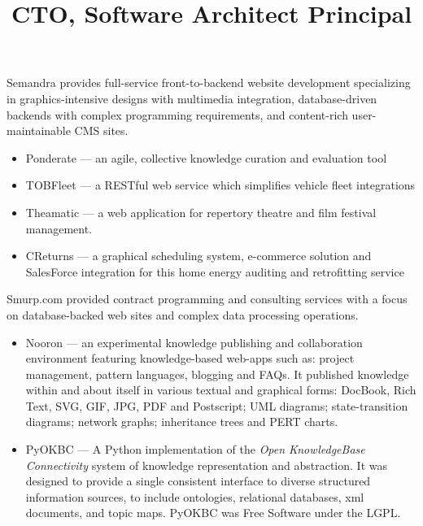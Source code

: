 \begin{resume}
\title{ CTO, Software Architect }
\begin{position}
Semandra provides full-service front-to-backend
website development specializing in graphics-intensive designs with
multimedia integration, database-driven backends with complex
programming requirements, and content-rich user-maintainable CMS
sites.

\begin{itemize}
  \item Ponderate --- an agile, collective knowledge curation and evaluation tool
  \item TOBFleet --- a RESTful web service which simplifies vehicle fleet integrations
  \item Theamatic --- a web application for repertory theatre and film 
    festival management.
  \item CReturns --- a graphical scheduling system, e-commerce
    solution and SalesForce integration for this home energy auditing and
    retrofitting service
\end{itemize}

\end{position}


\title{ Principal }

\begin{position}
Smurp.com provided contract programming and consulting services with a focus
on database-backed web sites and complex data processing operations.

\begin{itemize}
  \item Nooron --- an experimental knowledge publishing and collaboration
    environment featuring knowledge-based web-apps such as:
    project management, pattern languages, blogging and FAQs.
    It published knowledge within and about itself in various textual 
    and graphical forms:
    DocBook, Rich Text, SVG, GIF, JPG, PDF and Postscript;
    UML diagrams; state-transition diagrams; network graphs; 
    inheritance trees and PERT charts.

  \item PyOKBC --- A Python implementation of the 
     \emph{Open KnowledgeBase Connectivity}
  system of knowledge representation and abstraction.
  It was designed to provide a single consistent interface to diverse structured
  information sources, to include ontologies, relational databases,
  xml documents, and topic maps.  PyOKBC was Free Software under the LGPL.


\end{itemize}
\end{position}
\end{resume}

